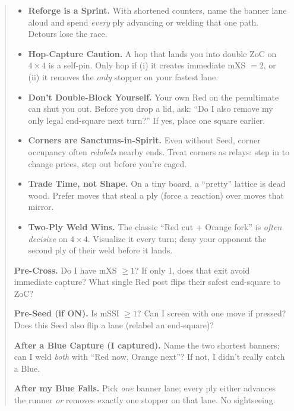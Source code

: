\documentclass[11pt]{article}
\begin{document}
\begin{quote}
\begin{itemize}[leftmargin=1.3em,itemsep=0.35em]
  \item \textbf{Reforge is a Sprint.} With shortened counters, name the banner lane aloud and spend \emph{every} ply advancing or welding that one path. Detours lose the race.

  \item \textbf{Hop-Capture Caution.} A hop that lands you into double ZoC on $4\times4$ is a self-pin. Only hop if (i) it creates immediate mXS $=2$, or (ii) it removes the \emph{only} stopper on your fastest lane.

  \item \textbf{Don’t Double-Block Yourself.} Your own Red on the penultimate can shut you out. Before you drop a lid, ask: “Do I also remove my only legal end-square next turn?” If yes, place one square earlier.

  \item \textbf{Corners are Sanctums-in-Spirit.} Even without Seed, corner occupancy often \emph{relabels} nearby ends. Treat corners as relays: step in to change prices, step out before you’re caged.

  \item \textbf{Trade Time, not Shape.} On a tiny board, a “pretty” lattice is dead wood. Prefer moves that steal a ply (force a reaction) over moves that mirror.

  \item \textbf{Two-Ply Weld Wins.} The classic “Red cut + Orange fork” is \emph{often decisive} on $4\times4$. Visualize it every turn; deny your opponent the second ply of their weld before it lands.
\end{itemize}

\medskip
\begin{tcolorbox}[enhanced,breakable,title={Pocket Checklists (Say it before you move)},
  colback=white,colframe=royal,boxrule=0.8pt]
\small
\textbf{Pre-Cross.} Do I have mXS $\ge 1$? If only 1, does that exit avoid immediate capture? What single Red post flips their safest end-square to ZoC?

\textbf{Pre-Seed (if ON).} Is mSSI $\ge 1$? Can I screen with one move if pressed? Does this Seed also flip a lane (relabel an end-square)?

\textbf{After a Blue Capture (I captured).} Name the two shortest banners; can I weld \emph{both} with “Red now, Orange next”? If not, I didn’t really catch a Blue.

\textbf{After my Blue Falls.} Pick \emph{one} banner lane; every ply either advances the runner \emph{or} removes exactly one stopper on that lane. No sightseeing.


\end{tcolorbox}
\end{quote}
\end{document}
